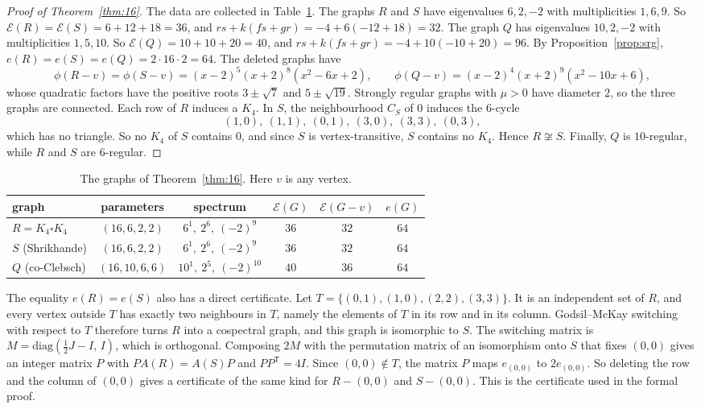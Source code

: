 \documentclass[11pt]{amsart}
\theoremstyle{remark}
\newcommand{\cE}{\mathcal{E}}
\begin{document}
\begin{proof}[Proof of Theorem~\ref{thm:16}]
The data are collected in Table~\ref{tab:16}.
The graphs $R$ and $S$ have eigenvalues $6,2,-2$ with multiplicities $1,6,9$.
So $\cE(R)=\cE(S)=6+12+18=36$, and $rs+k(fs+gr)=-4+6(-12+18)=32$.
The graph $Q$ has eigenvalues $10,2,-2$ with multiplicities $1,5,10$.
So $\cE(Q)=10+10+20=40$, and $rs+k(fs+gr)=-4+10(-10+20)=96$.
By Proposition~\ref{prop:srg}, $e(R)=e(S)=e(Q)=2\cdot16\cdot2=64$.
The deleted graphs have
\[
\phi(R-v)=\phi(S-v)=(x-2)^5(x+2)^8(x^2-6x+2),\qquad \phi(Q-v)=(x-2)^4(x+2)^9(x^2-10x+6),
\]
whose quadratic factors have the positive roots $3\pm\sqrt7$ and $5\pm\sqrt{19}$.
Strongly regular graphs with $\mu>0$ have diameter $2$, so the three graphs are connected.
Each row of $R$ induces a $K_4$.
In $S$, the neighbourhood $C_S$ of $0$ induces the $6$-cycle
\[
(1,0),\ (1,1),\ (0,1),\ (3,0),\ (3,3),\ (0,3),
\]
which has no triangle.
So no $K_4$ of $S$ contains $0$, and since $S$ is vertex-transitive, $S$ contains no $K_4$.
Hence $R\not\cong S$.
Finally, $Q$ is $10$-regular, while $R$ and $S$ are $6$-regular.
\end{proof}

\begin{table}[ht]
\caption{The graphs of Theorem~\ref{thm:16}. Here $v$ is any vertex.}\label{tab:16}
\begin{tabular}{lccccc}
\toprule
graph & parameters & spectrum & $\cE(G)$ & $\cE(G-v)$ & $e(G)$\\
\midrule
$R=K_4\square K_4$ & $(16,6,2,2)$ & $6^1,\ 2^6,\ (-2)^9$ & $36$ & $32$ & $64$\\
$S$ (Shrikhande) & $(16,6,2,2)$ & $6^1,\ 2^6,\ (-2)^9$ & $36$ & $32$ & $64$\\
$Q$ (co-Clebsch) & $(16,10,6,6)$ & $10^1,\ 2^5,\ (-2)^{10}$ & $40$ & $36$ & $64$\\
\bottomrule
\end{tabular}
\end{table}

The equality $e(R)=e(S)$ also has a direct certificate.
Let $T=\{(0,1),(1,0),(2,2),(3,3)\}$.
It is an independent set of $R$, and every vertex outside $T$ has exactly two neighbours in $T$, namely the elements of $T$ in its row and in its column.
Godsil--McKay switching \cite{GM82} with respect to $T$ therefore turns $R$ into a cospectral graph, and this graph is isomorphic to $S$.
The switching matrix is $M=\mathrm{diag}(\tfrac12J-I,\,I)$, which is orthogonal.
Composing $2M$ with the permutation matrix of an isomorphism onto $S$ that fixes $(0,0)$ gives an integer matrix $P$ with $PA(R)=A(S)P$ and $PP^{\mathsf T}=4I$.
Since $(0,0)\notin T$, the matrix $P$ maps $e_{(0,0)}$ to $2e_{(0,0)}$.
So deleting the row and the column of $(0,0)$ gives a certificate of the same kind for $R-(0,0)$ and $S-(0,0)$.
This is the certificate used in the formal proof.
\end{document}

